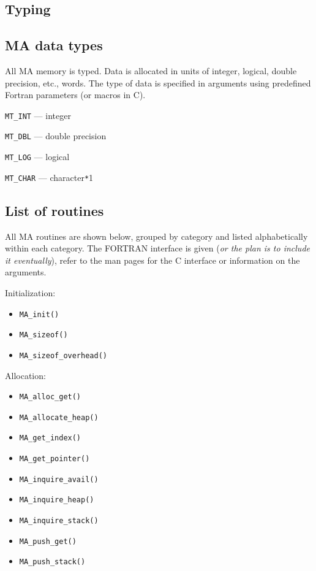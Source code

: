 \subsection{Typing}

\subsection{MA data types}

All MA memory is typed.  Data is allocated in units of integer,
logical, double precision, etc., words.  The type of data is specified
in arguments using predefined Fortran parameters (or macros in C).
\begin{description}
\item{\verb+MT_INT+} --- integer
\item{\verb+MT_DBL+} --- double precision
\item{\verb+MT_LOG+} --- logical
\item{\verb+MT_CHAR+} --- character\verb+*+1
\end{description}

\subsection{List of routines}

All MA routines are shown below, grouped by category and listed
alphabetically within each category.  The FORTRAN interface is given
({\em or the plan is to include it eventually}),
refer to the man pages for the C interface or information on the
arguments.

Initialization: 
\begin{itemize}
\item {\tt MA\_init()}
\item {\tt MA\_sizeof()}
\item {\tt MA\_sizeof\_overhead()}
\end{itemize}

Allocation:
\begin{itemize}
\item {\tt MA\_alloc\_get()}
\item {\tt MA\_allocate\_heap()}
\item {\tt MA\_get\_index()}
\item {\tt MA\_get\_pointer()}
\item {\tt MA\_inquire\_avail()}
\item {\tt MA\_inquire\_heap()}
\item {\tt MA\_inquire\_stack()}
\item {\tt MA\_push\_get()}
\item {\tt MA\_push\_stack()}
\end{itemize}

